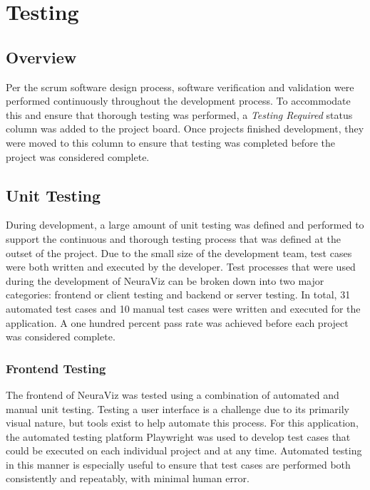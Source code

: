 \section{Testing}
\label{sec:Testing}

\subsection{Overview} 
Per the scrum software design process, software verification and validation were performed continuously throughout the development process. To accommodate this and ensure that thorough testing was performed, a \textit{Testing Required} status column was added to the project board. Once projects finished development, they were moved to this column to ensure that testing was completed before the project was considered complete.

\subsection{Unit Testing}
During development, a large amount of unit testing was defined and performed to support the continuous and thorough testing process that was defined at the outset of the project. Due to the small size of the development team, test cases were both written and executed by the developer. Test processes that were used during the development of NeuraViz can be broken down into two major categories: frontend or client testing and backend or server testing. In total, 31 automated test cases and 10 manual test cases were written and executed for the application. A one hundred percent pass rate was achieved before each project was considered complete.

\subsubsection{Frontend Testing}
The frontend of NeuraViz was tested using a combination of automated and manual unit testing. Testing a user interface is a challenge due to its primarily visual nature, but tools exist to help automate this process. For this application, the automated testing platform Playwright \cite{playwright} was used to develop test cases that could be executed on each individual project and at any time. Automated testing in this manner is especially useful to ensure that test cases are performed both consistently and repeatably, with minimal human error. 

